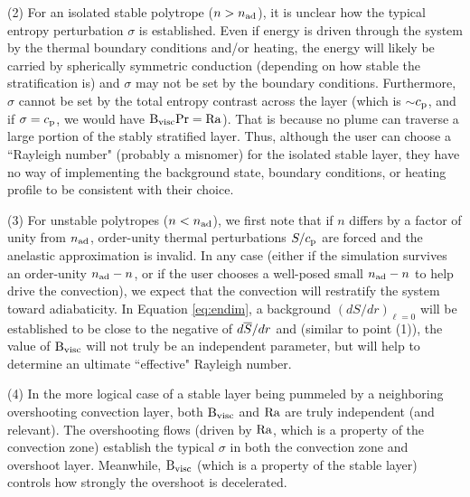 \documentclass[12pt]{article}
\numberwithin{equation}{section}
\newcommand{\nad}{n_{\rm{ad}}}
\begin{document}
(2) For an isolated stable polytrope ($n>\nad$), it is unclear how the typical entropy perturbation $\sigma$ is established. Even if energy is driven through the system by the thermal boundary conditions and/or heating, the energy will likely be carried by spherically symmetric conduction (depending on how stable the stratification is) and $\sigma$ may not be set by the boundary conditions. Furthermore, $\sigma$ cannot be set by the total entropy contrast across the layer (which is $\sim$$c_{\rm{p}}$, and if $\sigma=c_{\rm{p}}$, we would have ${\rm{B_{visc}}}{\rm{Pr}} = {\rm{Ra}}$). That is because no plume can traverse a large portion of the stably stratified layer. Thus, although the user can choose a ``Rayleigh number" (probably a misnomer) for the isolated stable layer, they have no way of implementing the background state, boundary conditions, or heating profile to be consistent with their choice. 

(3) For unstable polytropes ($n<\nad$), we first note that if $n$ differs by a factor of unity from $\nad$, order-unity thermal perturbations $S/c_{\rm{p}}$ are forced and the anelastic approximation is invalid. In any case (either if the simulation survives an order-unity $\nad-n$, or if the user chooses  a well-posed small $\nad-n$ to help drive the convection), we expect that the convection will restratify the system toward adiabaticity. In Equation \eqref{eq:endim}, a background $(dS/dr)_{\ell=0}$ will be established to be close to the negative of $d\overline{S}/dr$ and (similar to point (1)), the value of ${\rm{B_{visc}}}$ will not truly be an independent parameter, but will help to determine an ultimate ``effective" Rayleigh number. 

(4) In the more logical case of a stable layer being pummeled by a neighboring overshooting convection layer, both ${\rm{B_{visc}}}$ and ${\rm{Ra}}$ are truly independent (and relevant). The overshooting flows (driven by ${\rm{Ra}}$, which is a property of the convection zone) establish the typical $\sigma$ in both the convection zone and overshoot layer. Meanwhile, ${\rm{B_{visc}}}$ (which is a property of the stable layer) controls how strongly the overshoot is decelerated. 
\end{document}
